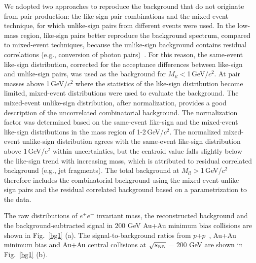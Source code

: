 \documentclass[twocolumn,showpacs,amsmath,amssymb,superscriptaddress,nofootinbib]{revtex4-1}
\newcommand{\sNN}{$\sqrt{s_{\rm NN}}$ }
\newcommand{\GeVcsq}{GeV/$c^2$ }
\begin{document}
We adopted two approaches to reproduce the background that do not originate from pair production: the like-sign pair combinations and the mixed-event technique, for which unlike-sign pairs from different events were used.
In the low-mass region, like-sign pairs better reproduce the background spectrum, compared to mixed-event techniques, because the unlike-sign background contains residual correlations (e.g., conversion of photon pairs)~\cite{STARpp}. For this reason, the same-event like-sign distribution, corrected for the acceptance differences between like-sign and unlike-sign pairs, was used as the background for $M_{ll}<$1\,GeV/$c^2$.
At pair masses above 1\,\GeVcsq where the statistics of the like-sign distribution become limited, mixed-event distributions were used to evaluate the background. The mixed-event unlike-sign distribution, after
normalization, provides a good description of the uncorrelated combinatorial background. The normalization factor was determined based on the same-event like-sign and the mixed-event like-sign distributions in the mass region of 1-2\,GeV/$c^2$.
The normalized mixed-event unlike-sign distribution agrees with the same-event like-sign distribution above 1\,GeV/$c^{2}$ within uncertainties, but the centroid value falls slightly below the like-sign trend with increasing mass, which is attributed to residual correlated background (e.g., jet fragments).
The total background at $M_{ll}>$1\,GeV/$c^2$ therefore includes the combinatorial background using the mixed-event unlike-sign pairs and the residual correlated background based on a parametrization to the data.

The raw distributions of $e^+e^-$ invariant mass, the reconstructed background and the background-subtracted signal in 200 GeV Au+Au minimum bias collisions are shown in Fig.~\ref{bg1} (a). The signal-to-background ratios from $p$+$p$~\cite{STARpp}, Au+Au minimum bias and Au+Au central collisions at \sNN = 200 GeV are shown in Fig.~\ref{bg1} (b).

\end{document}
